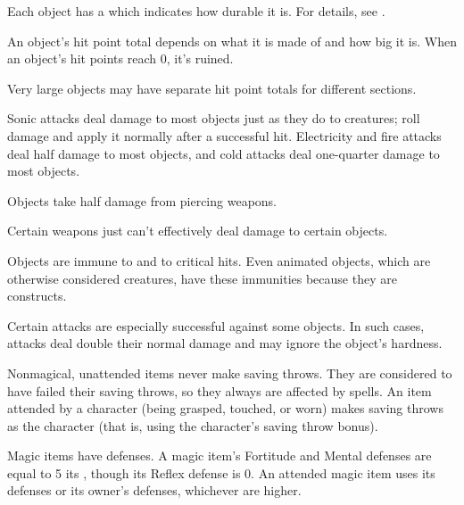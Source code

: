              Each object has a  which indicates how durable it is.
            For details, see .

             An object's hit point total depends on what it is made of and how big it is. When an object's hit points reach 0, it's ruined.

            Very large objects may have separate hit point totals for different sections.

             Sonic attacks deal damage to most objects just as they do to creatures; roll damage and apply it normally after a successful hit. Electricity and fire attacks deal half damage to most objects, and cold attacks deal one-quarter damage to most objects.

             Objects take half damage from piercing weapons.

             Certain weapons just can't effectively deal damage to certain objects.

             Objects are immune to  and to critical hits. Even animated objects, which are otherwise considered creatures, have these immunities because they are constructs.

             Certain attacks are especially successful against some objects. In such cases, attacks deal double their normal damage and may ignore the object's hardness.

             Nonmagical, unattended items never make saving throws. They are considered to have failed their saving throws, so they always are affected by spells. An item attended by a character (being grasped, touched, or worn) makes saving throws as the character (that is, using the character's saving throw bonus).

            \par Magic items have defenses. A magic item's Fortitude and Mental defenses are equal to 5 \add its , though its Reflex defense is 0. An attended magic item uses its defenses or its owner's defenses, whichever are higher.

